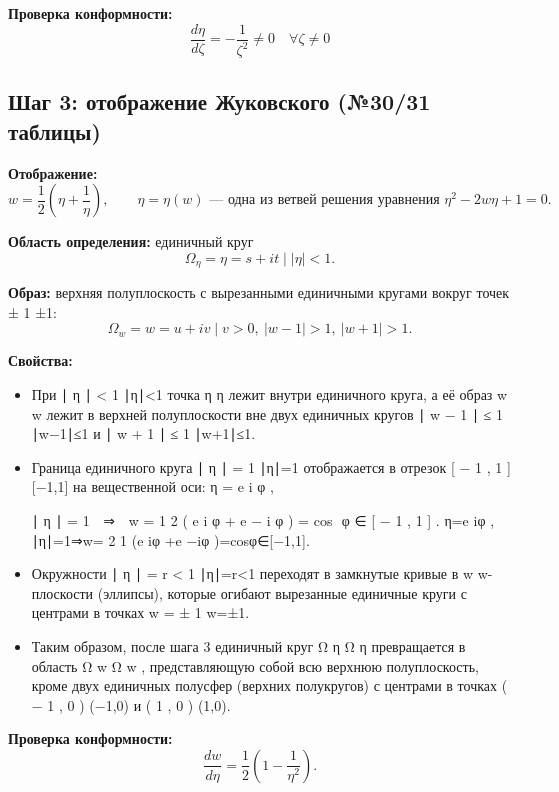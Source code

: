 \documentclass[12pt,a4paper]{article}
\begin{document}
\textbf{Проверка конформности:}
\[
\frac{d\eta}{d\zeta} = -\frac{1}{\zeta^2} \neq 0 \quad \forall \zeta \neq 0
\]

\subsection{Шаг 3: отображение Жуковского (№30/31 таблицы)}

\textbf{Отображение:}
\begin{equation}
w = \frac{1}{2}\left(\eta + \frac{1}{\eta}\right),
\qquad
\eta = \eta(w) \text{ — одна из ветвей решения уравнения } \eta^2 - 2w\eta + 1 = 0.
\end{equation}

\textbf{Область определения:} единичный круг
\begin{equation}
\Omega_\eta = {\eta = s + it \mid |\eta| < 1}.
\end{equation}

\textbf{Образ:} верхняя полуплоскость с вырезанными единичными кругами вокруг точек 
±
1
±1:
\begin{equation}
\Omega_w = {w = u + iv \mid v > 0,\ |w - 1| > 1,\ |w + 1| > 1}.
\end{equation}

\textbf{Свойства:}
\begin{itemize}
\item При 
∣
η
∣
<
1
∣η∣<1 точка 
η
η лежит внутри единичного круга, а её образ 
w
w лежит в верхней полуплоскости вне двух единичных кругов 
∣
w
−
1
∣
≤
1
∣w−1∣≤1 и 
∣
w
+
1
∣
≤
1
∣w+1∣≤1.
\item Граница единичного круга 
∣
η
∣
=
1
∣η∣=1 отображается в отрезок 
[
−
1
,
1
]
[−1,1] на вещественной оси:
η
=
e
i
φ
,
 
∣
η
∣
=
1
  
⇒
  
w
=
1
2
(
e
i
φ
+
e
−
i
φ
)
=
cos
⁡
φ
∈
[
−
1
,
1
]
.
η=e 
iφ
 , ∣η∣=1⇒w= 
2
1
 (e 
iφ
 +e 
−iφ
 )=cosφ∈[−1,1].
\item Окружности 
∣
η
∣
=
r
<
1
∣η∣=r<1 переходят в замкнутые кривые в 
w
w-плоскости (эллипсы), которые огибают вырезанные единичные круги с центрами в точках 
w
=
±
1
w=±1.
\item Таким образом, после шага 3 единичный круг 
Ω
η
Ω 
η
  превращается в область 
Ω
w
Ω 
w
 , представляющую собой всю верхнюю полуплоскость, кроме двух единичных полусфер (верхних полукругов) с центрами в точках 
(
−
1
,
0
)
(−1,0) и 
(
1
,
0
)
(1,0).
\end{itemize}

\textbf{Проверка конформности:}
\begin{equation}
\frac{dw}{d\eta} = \frac{1}{2}\left(1 - \frac{1}{\eta^2}\right).
\end{equation}
\end{document}
